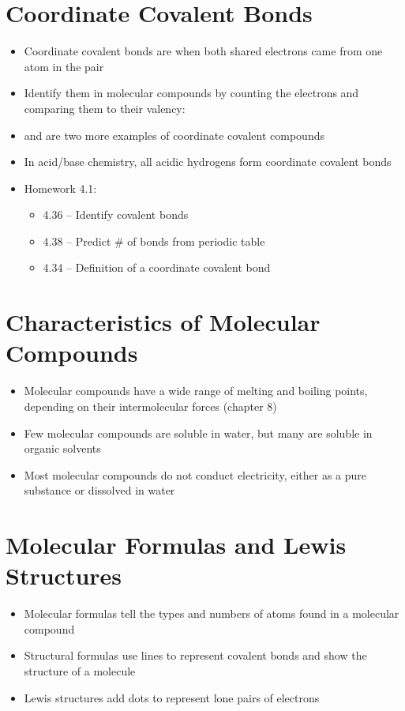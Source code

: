 \documentclass[12pt, openany, letterpaper]{memoir}
\begin{document}
\section{Coordinate Covalent Bonds}
\begin{itemize}
	\item Coordinate covalent bonds are when both shared electrons came from one atom in the pair
	\item Identify them in molecular compounds by counting the electrons and comparing them to their valency: 
	\item {} and  are two more examples of coordinate covalent compounds
	\item In acid/base chemistry, all acidic hydrogens form coordinate covalent bonds
	\item Homework 4.1:
	      \begin{itemize}
		      \item 4.36 -- Identify covalent bonds
		      \item 4.38 -- Predict \# of bonds from periodic table
		      \item 4.34 -- Definition of a coordinate covalent bond
	      \end{itemize}
\end{itemize}
\section{Characteristics of Molecular Compounds}
\begin{itemize}
	\item Molecular compounds have a wide range of melting and boiling points, depending on their intermolecular forces (chapter 8)
	\item Few molecular compounds are soluble in water, but many are soluble in organic solvents
	\item Most molecular compounds do not conduct electricity, either as a pure substance or dissolved in water
\end{itemize}
\section{Molecular Formulas and Lewis Structures}
\begin{itemize}
	\item Molecular formulas tell the types and numbers of atoms found in a molecular compound
	\item Structural formulas use lines to represent covalent bonds and show the structure of a molecule
	\item Lewis structures add dots to represent lone pairs of electrons
\end{itemize}
\end{document}
